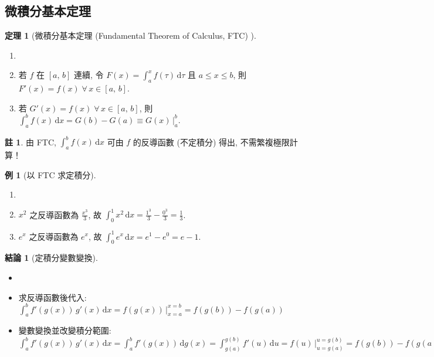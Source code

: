 \documentclass[12pt,a4paper]{extarticle}
\newcommand{\ds}{\displaystyle}
\theoremstyle{definition}
\newtheorem*{fact}{結論}
\newtheorem*{thm}{定理}
\newtheorem*{ex}{例}
\newtheorem*{rmk}{註}
\begin{document}
\subsection*{微積分基本定理}

\begin{thm}[微積分基本定理 (Fundamental Theorem of Calculus, FTC) ]
  \begin{enumerate}\setlength{\itemsep}{0pt}
    \item[]
    \item 若 $f$ 在 $[a,\,b]$ 連續, 令 $\ds F(x) = \int_a^x f(\tau)\,\mathrm{d}\tau$ 且 $a\leqslant x\leqslant b$, 則 $\ds F'(x) = f(x)\;\forall\,x\in[a,\,b]$. 
    \item 若 $\ds G'(x) = f(x)\;\forall\,x\in[a,\,b]$, 則 $\ds\int_a^b f(x)\,\mathrm{d}x = G(b) - G(a) \equiv G(x)\,\Big|_a^b$. 
  \end{enumerate}
\end{thm}

\begin{rmk}
  由 FTC, $\ds\int_a^b f(x)\,\mathrm{d}x$ 可由 $f$ 的反導函數 (不定積分) 得出, 不需繁複極限計算！
\end{rmk}

\begin{ex}[以 FTC 求定積分]
  \begin{enumerate}\setlength{\itemsep}{0pt}
    \item[]
    \item $\ds x^2$ 之反導函數為 $\ds\frac{x^3}{3}$, 故 $\ds\int_0^1 x^2\,\text{d}x = \frac{1^3}{3} - \frac{0^3}{3} = \frac{1}{3}$. 
    \item $\ds e^x$ 之反導函數為 $\ds e^x$, 故 $\ds\int_0^1 e^x\,\text{d}x = e^1 - e^0 = e - 1$. 
  \end{enumerate}
\end{ex}

\begin{fact}[定積分變數變換]
  \begin{itemize}\setlength{\itemsep}{0pt}
    \item[]
    \item 求反導函數後代入: $\ds\int_a^b f'(g(x))\,g'(x)\,\text{d}x = f(g(x))\,\Big|_{x = a}^{x = b} = f(g(b)) - f(g(a))$
    \item 變數變換並改變積分範圍: $\ds\int_a^b f'(g(x))\,g'(x)\,\text{d}x = \int_a^b f'(g(x))\,\text{d}g(x) =\int_{g(a)}^{g(b)} f'(u)\,\text{d}u = f(u)\,\Big|_{u = g(a)}^{u = g(b)} = f(g(b)) - f(g(a))$
  \end{itemize}
\end{fact}
\end{document}
